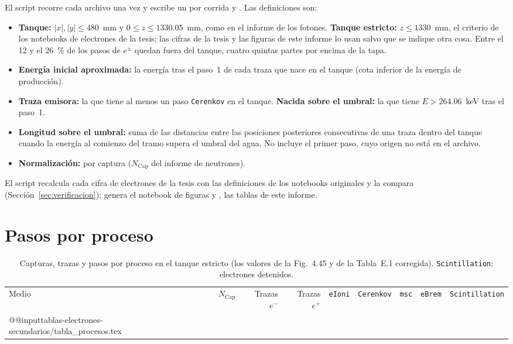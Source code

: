 \documentclass[11pt,a4paper]{article}
\newcommand{\tablas}{tablas-electrones-secundarios}
\newcommand{\var}[1]{\texttt{#1}}
\begin{document}
El script  recorre cada archivo una vez y escribe un  por corrida y . Las definiciones son:
\begin{itemize}
  \item \textbf{Tanque:} $|x|,|y|\le480$~mm y $0\le z\le1330.05$~mm, como en el informe de los fotones. \textbf{Tanque estricto:} $z\le1330$~mm, el criterio de los notebooks de electrones de la tesis; las cifras de la tesis y las figuras de este informe lo usan salvo que se indique otra cosa. Entre el 12 y el 26~\% de los pasos de $e^\pm$ quedan fuera del tanque, cuatro quintas partes por encima de la tapa.
  \item \textbf{Energía inicial aproximada:} la energía tras el paso~1 de cada traza que nace en el tanque (cota inferior de la energía de producción).
  \item \textbf{Traza emisora:} la que tiene al menos un paso \var{Cerenkov} en el tanque. \textbf{Nacida sobre el umbral:} la que tiene $E>264.06$~keV tras el paso~1.
  \item \textbf{Longitud sobre el umbral:} suma de las distancias entre las posiciones posteriores consecutivas de una traza dentro del tanque cuando la energía al comienzo del tramo supera el umbral del agua. No incluye el primer paso, cuyo origen no está en el archivo.
  \item \textbf{Normalización:} por captura ($N_\mathrm{Cap}$ del informe de neutrones).
\end{itemize}
El script  recalcula cada cifra de electrones de la tesis con las definiciones de los notebooks originales y la compara (Sección~\ref{sec:verificacion});  genera el notebook de figuras y , las tablas de este informe.

\section{Pasos por proceso}
\label{sec:procesos}

\begin{table}[H]
\centering\footnotesize
\setlength{\tabcolsep}{4pt}
\caption{Capturas, trazas y pasos por proceso en el tanque estricto (los valores de la Fig.~4.45 y de la Tabla~E.1 corregida). \var{Scintillation}: electrones detenidos.}
\label{tab:procesos}
\begin{tabular}{@{}lrrrrrrrr@{}}
\toprule
Medio & $N_\mathrm{Cap}$ & Trazas $e^-$ & Trazas $e^+$ & \var{eIoni} & \var{Cerenkov} & \var{msc} & \var{eBrem} & \var{Scintillation} \\
\csname @@input\endcsname \tablas/tabla_procesos.tex
\bottomrule
\end{tabular}
\end{table}
\end{document}
